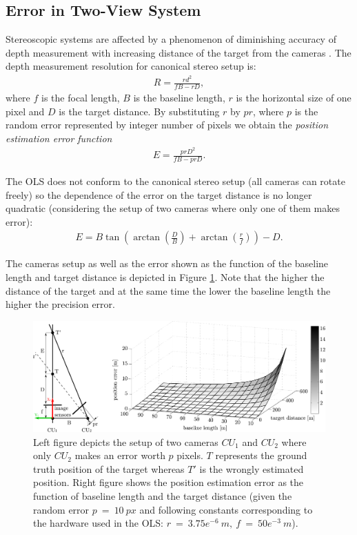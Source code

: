 \subsection{Error in Two-View System}

Stereoscopic systems are affected by a phenomenon of diminishing accuracy of depth measurement with increasing distance of the target from the cameras \cite{Cyganek:2007:ICV:1214366}. The depth measurement resolution for canonical stereo setup is:
\begin{align}
R = \frac{rd^{2}}{fB - rD},
\end{align}
where $f$ is the focal length, $B$ is the baseline length, $r$ is the horizontal size of one pixel and $D$ is the target distance. By substituting $r$ by $pr$, where $p$ is the random error represented by integer number of pixels we obtain the \textit{position estimation error function}
\begin{align}
E = \frac{prD^{2}}{fB - prD}.
\end{align}

The OLS does not conform to the canonical stereo setup (all cameras can rotate freely) so the dependence of the error on the target distance is no longer quadratic (considering the setup of two cameras where only one of them makes error): 
\begin{align}
E = B\tan(\arctan(\frac{D}{B}) + \arctan(\frac{r}{f})) - D.
\end{align}

The cameras setup as well as the error shown as the function of the baseline length and target distance is depicted in Figure \ref{fig:errorGivenBaseAndDistance}. Note that the higher the distance of the target and at the same time the lower the baseline length the higher the precision error.

\begin{figure}[htb]\centering
	\centering
	\includegraphics[width=0.9\linewidth]{fig/error_2_units_baseline_distance}
	\caption{Left figure depicts the setup of two cameras $CU_{1}$ and $CU_{2}$ where only $CU_{2}$ makes an error worth $p$ pixels. $T$ represents the ground truth position of the target whereas $T'$ is the wrongly estimated position. Right figure shows the position estimation error as the function of baseline length and the target distance (given the random error $p~=~10~px$ and following constants corresponding to the hardware used in the OLS: $r~=~3.75e^{-6}~m,\ f~=~50e^{-3}~m$).}
	\label{fig:errorGivenBaseAndDistance}
\end{figure}

